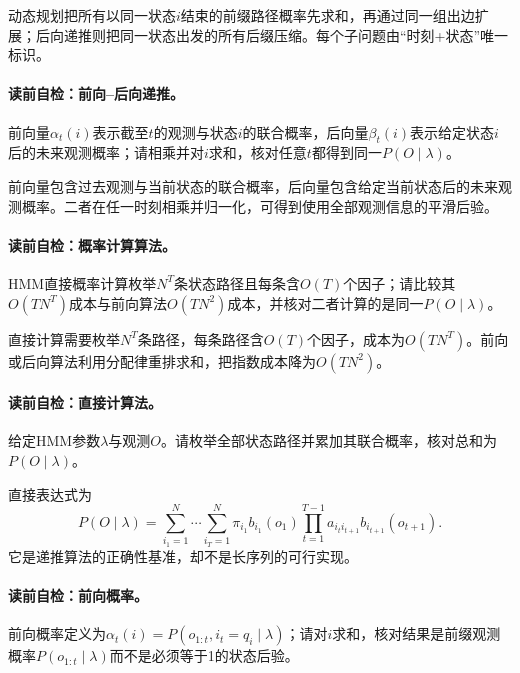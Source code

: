 动态规划把所有以同一状态$i$结束的前缀路径概率先求和，再通过同一组出边扩展；后向递推则把同一状态出发的所有后缀压缩。每个子问题由“时刻+状态”唯一标识。

\paragraph{读前自检：前向--后向递推。}前向量$\alpha_t(i)$表示截至$t$的观测与状态$i$的联合概率，后向量$\beta_t(i)$表示给定状态$i$后的未来观测概率；请相乘并对$i$求和，核对任意$t$都得到同一$P(O\mid\lambda)$。\par

前向量包含过去观测与当前状态的联合概率，后向量包含给定当前状态后的未来观测概率。二者在任一时刻相乘并归一化，可得到使用全部观测信息的平滑后验。

\paragraph{读前自检：概率计算算法。}HMM直接概率计算枚举$N^T$条状态路径且每条含$O(T)$个因子；请比较其$O(TN^T)$成本与前向算法$O(TN^2)$成本，并核对二者计算的是同一$P(O\mid\lambda)$。\par

直接计算需要枚举$N^T$条路径，每条路径含$O(T)$个因子，成本为$O(TN^T)$。前向或后向算法利用分配律重排求和，把指数成本降为$O(TN^2)$。

\paragraph{读前自检：直接计算法。}给定HMM参数$\lambda$与观测$O$。请枚举全部状态路径并累加其联合概率，核对总和为$P(O\mid\lambda)$。\par

直接表达式为
\[
P(O\mid\lambda)=\sum_{i_1=1}^{N}\cdots\sum_{i_T=1}^{N}
\pi_{i_1}b_{i_1}(o_1)\prod_{t=1}^{T-1}
a_{i_ti_{t+1}}b_{i_{t+1}}(o_{t+1}).
\]
它是递推算法的正确性基准，却不是长序列的可行实现。

\paragraph{读前自检：前向概率。}前向概率定义为$\alpha_t(i)=P(o_{1:t},i_t=q_i\mid\lambda)$；请对$i$求和，核对结果是前缀观测概率$P(o_{1:t}\mid\lambda)$而不是必须等于1的状态后验。\par

